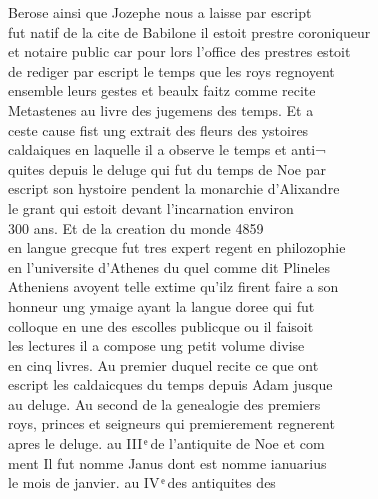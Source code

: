 \documentclass[12pt]{article}
\begin{document}
Berose ainsi que Jozephe nous a laisse par escript\\
fut natif de la cite de Babilone il estoit prestre coroniqueur\\
et notaire
          public car pour lors l'office des prestres estoit\\
de rediger par escript le
          temps que les roys regnoyent\\
ensemble leurs gestes et beaulx faitz comme
            recite\\
Metastenes au livre des jugemens des temps. Et a\\
ceste cause
          fist ung extrait des fleurs des ystoires\\
caldaiques en laquelle il a observe le temps et anti¬\\
quites depuis le
          deluge qui fut du temps de Noe par\\
escript son
          hystoire pendent la monarchie d'Alixandre\\
le grant qui estoit devant l'incarnation environ\\
300 ans. Et de la creation
          du monde 4859\\
 en langue grecque fut tres expert regent en philozophie\\
en l'universite d'Athenes du quel comme dit Plineles\\
Atheniens avoyent telle extime qu'ilz firent faire a son\\
honneur ung ymaige ayant la langue doree qui fut\\
colloque en une des
              escolles publicque ou il faisoit\\
les lectures  il a compose ung petit volume divise\\
en cinq
            livres. Au premier duquel recite ce que ont\\
escript les caldaicques du
          temps depuis Adam jusque\\
au
          deluge. Au second de la genealogie des premiers\\
roys, princes et seigneurs qui
          premierement regnerent\\
apres le deluge. au III ͤ de l'antiquite de Noe et com\\
ment Il fut nomme 
            Janus dont est nomme ianuarius\\
le mois de janvier. au IV ͤ des
          antiquites des
\end{document}
